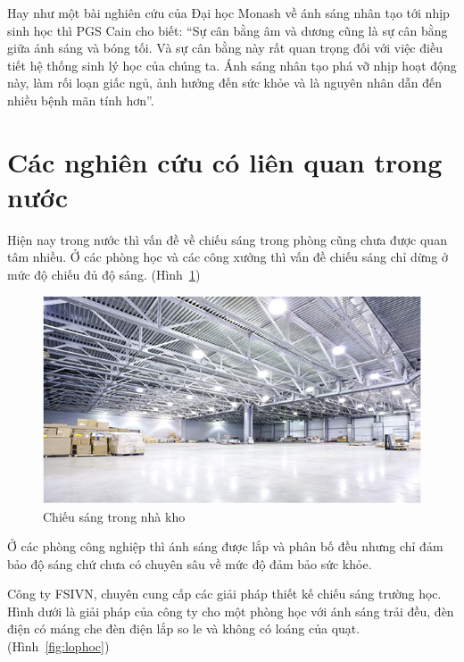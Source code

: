 Hay như một bài nghiên cứu của Đại học Monash về ánh sáng nhân tạo tới nhịp sinh học thì PGS Cain cho biết: “Sự cân bằng âm và dương cũng là sự cân bằng giữa ánh sáng và bóng tối. Và sự cân bằng này rất quan trọng đối với việc điều tiết hệ thống sinh lý học của chúng ta. Ánh sáng nhân tạo phá vỡ nhịp hoạt động này, làm rối loạn giấc ngủ, ảnh hưởng đến sức khỏe và là nguyên nhân dẫn đến nhiều bệnh mãn tính hơn”.

\section{Các nghiên cứu có liên quan trong nước}
Hiện nay trong nước thì vấn đề về chiếu sáng trong phòng cũng chưa được quan tâm nhiều. Ở các phòng học và các công xưởng thì vấn đề chiếu sáng chỉ dừng ở mức độ chiếu đủ độ sáng. (Hình~\ref{fig:nhakho})
\begin{center}
    \begin{figure}[!htp]
    \begin{center}
     \includegraphics[scale=0.9]{Chapters/Chapter2/ImagesChapter2/Nhakho}
    \end{center}
    \caption{Chiếu sáng trong nhà kho}
    \label{fig:nhakho}
    \end{figure}
\end{center}

Ở các phòng công nghiệp thì ánh sáng được lắp và phân bố đều nhưng chỉ đảm bảo độ sáng chứ chưa có chuyên sâu về mức độ đảm bảo sức khỏe.

Công ty FSIVN, chuyên cung cấp các giải pháp thiết kế chiếu sáng trường học. Hình dưới là giải pháp của công ty cho một phòng học với ánh sáng trải đều, đèn điện có máng che đèn điện lắp so le và không có loáng của quạt. (Hình~\ref{fig:lophoc})

